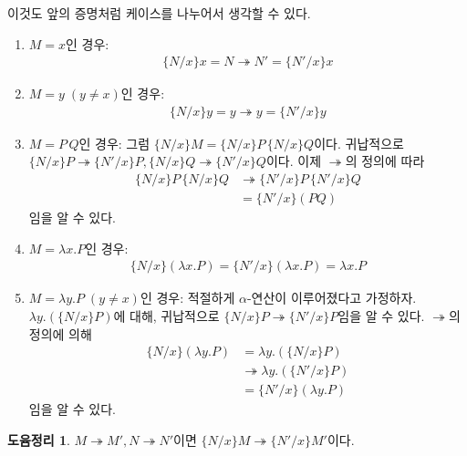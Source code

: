 \documentclass[b5paper, 10pt]{book}
\theoremstyle{definition}
\newtheorem{lem}[defn]{도윰정리}
\newenvironment{pf*}{\pushQED{\qed}\pf}{\popQED\endpf}
\begin{document}
\begin{pf*} 
    이것도 앞의 증명처럼 케이스를 나누어서 생각할 수 있다.
    \begin{enumerate}
        \item $M = x$인 경우: 
        \begin{align*}
            \{N / x\} x = N \twoheadrightarrow N' = \{N' / x\} x
        \end{align*}
        \item $M = y\; (y \neq x)$인 경우:
        \begin{align*}
            \{N / x\} y = y \twoheadrightarrow y = \{N' / x\} y
        \end{align*}
        \item $M = P \, Q$인 경우:
        그럼 $\{N /x \} M = \{N /x \} P \, \{N /x \} Q $이다. 귀납적으로 $\{N /x \} P 
        \twoheadrightarrow \{N' /x\} P,\{N /x \} Q \twoheadrightarrow \{N' /x \} Q $이다.
        이제 $\twoheadrightarrow$의 정의에 따라 
        \begin{align*}
            \{N /x \} P \, \{N /x \} Q &\twoheadrightarrow \{N' / x \} P \, \{N' /x \} Q \\
            &= \{N' / x\} (PQ)    
        \end{align*}
        임을 알 수 있다.
        \item $M = \lambda x. P$인 경우: 
        \begin{align*}
            \{N / x\} (\lambda x. P) = \{N' / x \} (\lambda x.P) = \lambda x. P
        \end{align*}
        \item $M = \lambda y. P \; (y \neq x)$인 경우: 적절하게 $\alpha$-연산이 이루어졌다고
        가정하자. $\lambda y. (\{N / x\} P)$에 대해, 귀납적으로 $\{N / x\} P \twoheadrightarrow \{N' / x \} P$임을
        알 수 있다. $\twoheadrightarrow$의 정의에 의해
        \begin{align*}
            \{N / x\} (\lambda y. P)& = \lambda y. (\{N /x\} P) \\ 
            &\twoheadrightarrow \lambda y. (\{ N' / x \} P) \\
            &= \{N' / x\} (\lambda y. P)
        \end{align*}
        임을 알 수 있다.
    \end{enumerate}
\end{pf*}
\begin{lem}
    $M \twoheadrightarrow M', N \twoheadrightarrow N'$이면
    $\{N / x \} M \twoheadrightarrow \{ N' / x \} M'$이다.
\end{lem}
\end{document}
